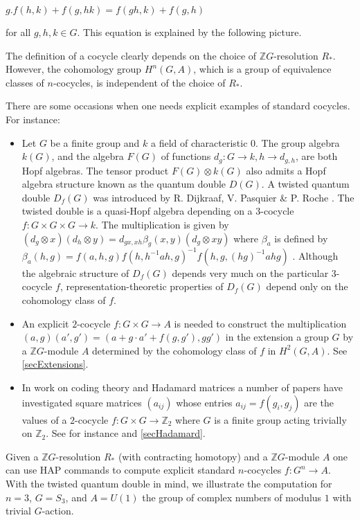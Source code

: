 \documentclass[a4paper,11pt]{report}
\begin{document}
{{$g.f(h,k) + f(g,hk) = f(gh,k) + f(g,h)$ 

 for all $g,h,k \in G$. This equation is explained by the following picture. 

 

 The definition of a cocycle clearly depends on the choice of $\mathbb ZG$-resolution $R_\ast$. However, the cohomology group $H^n(G,A)$, which is a group of equivalence classes of $n$-cocycles, is independent of the choice of $R_\ast$. 

 There are some occasions when one needs explicit examples of standard
cocycles. For instance: 
\begin{itemize}
\item  Let $G$ be a finite group and $k$ a field of characteristic $0$. The group algebra $k(G)$, and the algebra $F(G)$ of functions $d_g\colon G\rightarrow k, h\rightarrow d_{g,h}$, are both Hopf algebras. The tensor product $F(G) \otimes k(G)$ also admits a Hopf algebra structure known as the quantum double $D(G)$. A twisted quantum double $D_f(G)$ was introduced by R. Dijkraaf, V. Pasquier \& P. Roche \cite{dpr}. The twisted double is a quasi-Hopf algebra depending on a $3$-cocycle $f\colon G\times G\times G\rightarrow k$. The multiplication is given by $(d_g \otimes x)(d_h \otimes y) = d_{gx,xh}\beta_g(x,y)(d_g \otimes xy)$ where $\beta_a $ is defined by $\beta_a(h,g) = f(a,h,g) f(h,h^{-1}ah,g)^{-1} f(h,g,(hg)^{-1}ahg)$ . Although the algebraic structure of $D_f(G)$ depends very much on the particular $3$-cocycle $f$, representation-theoretic properties of $D_f(G)$ depend only on the cohomology class of $f$. 
\item  An explicit $2$-cocycle $f\colon G\times G\rightarrow A$ is needed to construct the multiplication $(a,g)(a',g') = (a + g\cdot a' + f(g,g'), gg')$ in the extension a group $G$ by a $\mathbb ZG$-module $A$ determined by the cohomology class of $f$ in $H^2(G,A)$. See \ref{secExtensions}. 
\item  In work on coding theory and Hadamard matrices a number of papers have
investigated square matrices $(a_{ij})$ whose entries $a_{ij}=f(g_i,g_j)$ are the values of a $2$-cocycle $f\colon G\times G \rightarrow \mathbb Z_2$ where $G$ is a finite group acting trivially on $\mathbb Z_2$. See for instance \cite{horadam} and \ref{secHadamard}. 
\end{itemize}
 

 Given a $\mathbb ZG$-resolution $R_\ast$ (with contracting homotopy) and a $\mathbb ZG$-module $A$ one can use HAP commands to compute explicit standard $n$-cocycles $f\colon G^n \rightarrow A$. With the twisted quantum double in mind, we illustrate the computation for $n=3$, $G=S_3$, and $A=U(1)$ the group of complex numbers of modulus $1$ with trivial $G$-action. 

}}
\end{document}

